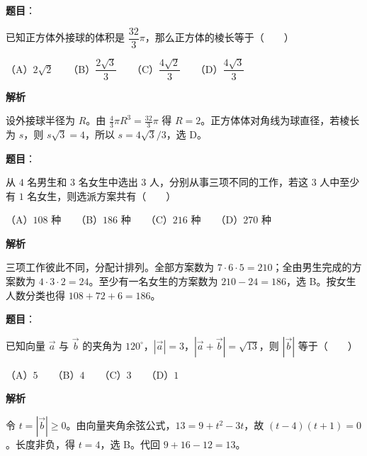 \begin{answer}

\textbf{题目}：

已知正方体外接球的体积是 $\dfrac{32}{3}\pi$，那么正方体的棱长等于\mbox{（　　）}

（A）$2\sqrt2$　　（B）$\dfrac{2\sqrt3}{3}$　　（C）$\dfrac{4\sqrt2}{3}$　　（D）$\dfrac{4\sqrt3}{3}$

\textbf{解析}

设外接球半径为 $R$。由 $\frac43\pi R^3=\frac{32}3\pi$ 得 $R=2$。正方体体对角线为球直径，若棱长为 $s$，则 $s\sqrt3=4$，所以 $s=4\sqrt3/3$，选 D。


\end{answer}
\begin{answer}

\textbf{题目}：

从 $4$ 名男生和 $3$ 名女生中选出 $3$ 人，分别从事三项不同的工作，若这 $3$ 人中至少有 $1$ 名女生，则选派方案共有\mbox{（　　）}

（A）$108$ 种　　（B）$186$ 种　　（C）$216$ 种　　（D）$270$ 种

\textbf{解析}

三项工作彼此不同，分配计排列。全部方案数为 $7\cdot6\cdot5=210$；全由男生完成的方案数为 $4\cdot3\cdot2=24$。至少有一名女生的方案数为 $210-24=186$，选 B。按女生人数分类也得 $108+72+6=186$。


\end{answer}
\begin{answer}

\textbf{题目}：

已知向量 $\vec a$ 与 $\vec b$ 的夹角为 $120^\circ$，$|\vec a|=3$，$|\vec a+\vec b|=\sqrt{13}$，则 $|\vec b|$ 等于\mbox{（　　）}

（A）$5$　　（B）$4$　　（C）$3$　　（D）$1$

\textbf{解析}

令 $t=|\vec b|\ge0$。由向量夹角余弦公式，$13=9+t^2-3t$，故 $(t-4)(t+1)=0$。长度非负，得 $t=4$，选 B。代回 $9+16-12=13$。


\end{answer}
